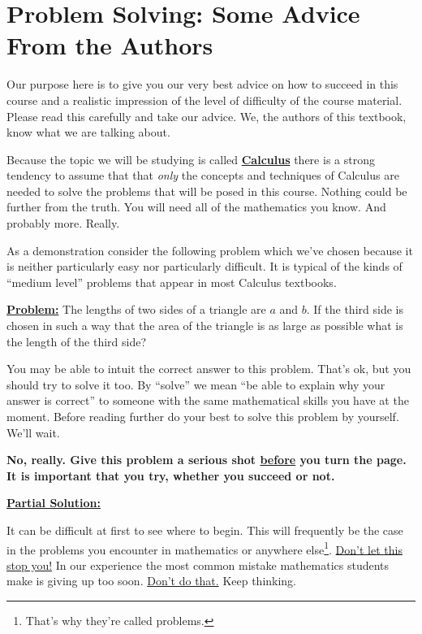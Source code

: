 \chapter*{Problem Solving: Some Advice From the Authors}
\label{cha:problem-solving}
\pagestyle{myheadings}

Our purpose here is to give you our very best advice on how to succeed
in this course and a realistic impression of the level of difficulty
of the course material. Please read this carefully and take our advice. We,
the authors of this textbook, know what we are talking about.

Because the topic we will be studying is called
\underline{\bf{}Calculus} there is a strong tendency to assume that
that \emph{only} the concepts and techniques of Calculus are needed to
solve the problems that will be posed in this course. Nothing could be
further from the truth. You will need all of the mathematics you
know. And probably more. Really.

As a demonstration consider the following problem which we've chosen
because it is neither particularly easy nor particularly difficult. It
is typical of the kinds of ``medium level'' problems that appear in
most Calculus textbooks.

\noindent{}\underline{\bf{} Problem:}
  The lengths of two sides of a triangle are $a$ and $b.$ If the third
  side is chosen in such a way that the area of the triangle is as
  large as possible what is the length of the third side?

  You may be able to intuit the correct answer to this problem. That's
  ok, but you should try to solve it too. By ``solve'' we mean ``be
  able to explain why your answer is correct'' to someone with the
  same mathematical skills you have at the moment. Before reading
  further do your best to solve this problem by yourself. We'll wait.

  \vfill{} {\Huge\bf{} No, really. Give this problem a serious shot
    \underline{before} you turn the page. It is important that you
    try, whether you succeed or not.}  
  \vfill{} 
  \newpage{}

\noindent{}\underline{\bf{}Partial Solution:}

It can be difficult at first to see where to begin. This will frequently
be the case in the problems you encounter in mathematics or anywhere
else\footnote{That's why they're called problems.}.  \underline{Don't
  let this stop you!} In our experience the most common mistake
mathematics students make is giving up too soon. \underline{Don't do
  that.}  Keep thinking. 

